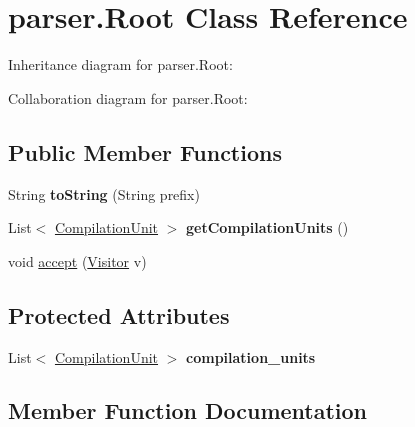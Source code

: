\hypertarget{classparser_1_1_root}{}\section{parser.\+Root Class Reference}
\label{classparser_1_1_root}


Inheritance diagram for parser.\+Root\+:


Collaboration diagram for parser.\+Root\+:
\subsection*{Public Member Functions}
\begin{DoxyCompactItemize}
\item 
String {\bfseries to\+String} (String prefix)\hypertarget{classparser_1_1_root_a52d1abb30817c8a9eb13ae226ebeffeb}{}\label{classparser_1_1_root_a52d1abb30817c8a9eb13ae226ebeffeb}

\item 
List$<$ \hyperlink{classparser_1_1_compilation_unit}{Compilation\+Unit} $>$ {\bfseries get\+Compilation\+Units} ()\hypertarget{classparser_1_1_root_a88a9ebfcb4cfb13674df75398fd4e852}{}\label{classparser_1_1_root_a88a9ebfcb4cfb13674df75398fd4e852}

\item 
void \hyperlink{classparser_1_1_root_ab7c5827ee2a39c5ad288d9494ef92e00}{accept} (\hyperlink{interfacemain_1_1_visitor}{Visitor} v)
\end{DoxyCompactItemize}
\subsection*{Protected Attributes}
\begin{DoxyCompactItemize}
\item 
List$<$ \hyperlink{classparser_1_1_compilation_unit}{Compilation\+Unit} $>$ {\bfseries compilation\+\_\+units}\hypertarget{classparser_1_1_root_a3f0fe7cc9d4e8fe9e77b53b288c854d3}{}\label{classparser_1_1_root_a3f0fe7cc9d4e8fe9e77b53b288c854d3}

\end{DoxyCompactItemize}


\subsection{Member Function Documentation}
